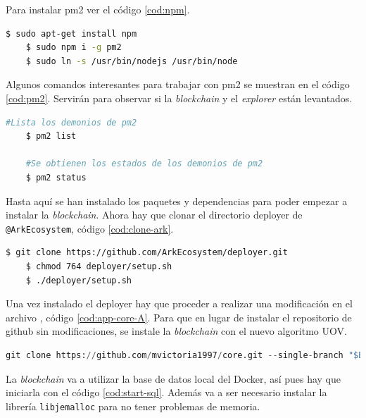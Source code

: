 Para instalar pm2 ver el código \ref{cod:npm}.\\

\begin{lstlisting}[language=Bash,caption=Instalación \textit{blockchain}. Parte VIII, label=cod:npm, style=Consola]
	$ sudo apt-get install npm
	$ sudo npm i -g pm2
	$ sudo ln -s /usr/bin/nodejs /usr/bin/node
\end{lstlisting}

Algunos comandos interesantes para trabajar con pm2 se muestran en el código \ref{cod:pm2}. Servirán para observar si la \textit{blockchain} y el \textit{explorer} están levantados.

\begin{lstlisting}[language=Bash,caption=Comandos útiles de pm2, label=cod:pm2, style=Consola]
	#Lista los demonios de pm2
	$ pm2 list

	#Se obtienen los estados de los demonios de pm2
	$ pm2 status
\end{lstlisting}

Hasta aquí se han instalado los paquetes y dependencias para poder empezar a instalar la \textit{blockchain}. Ahora hay que clonar el directorio deployer de \texttt{@ArkEcosystem}, código \ref{cod:clone-ark}.\\

\begin{lstlisting}[language=Bash,caption=Instalación \textit{blockchain}. Parte IX, label=cod:clone-ark, style=Consola]
	$ git clone https://github.com/ArkEcosystem/deployer.git
	$ chmod 764 deployer/setup.sh
	$ ./deployer/setup.sh
\end{lstlisting}


Una vez instalado el deployer hay que proceder a realizar una modificación en el archivo , código \ref{cod:app-core-A}. Para que en lugar de instalar el repositorio de github sin modificaciones, se instale la \textit{blockchain} con el nuevo algoritmo UOV.

\begin{lstlisting}[language=Python,caption=Línea 108 app-core.sh, label=cod:app-core-A]
	git clone https://github.com/mvictoria1997/core.git --single-branch "$BRIDGECHAIN_PATH"
\end{lstlisting}

La \textit{blockchain} va a utilizar la base de datos local del Docker, así pues hay que iniciarla con el código \ref{cod:start-sql}. Además va a ser necesario instalar la librería \texttt{libjemalloc} para no tener problemas de memoria.

